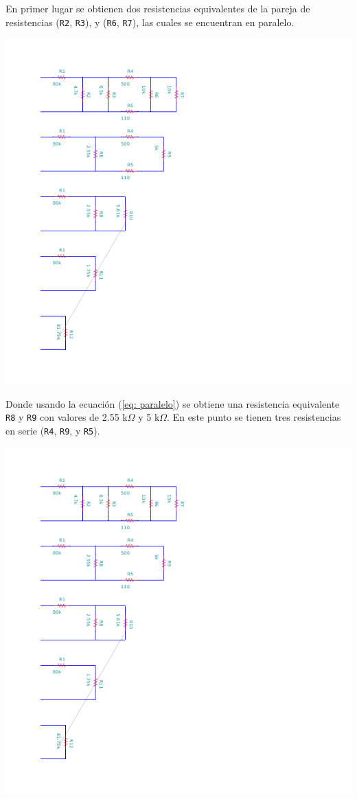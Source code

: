 \documentclass[12pt]{article}
\begin{document}
En primer lugar se obtienen dos resistencias equivalentes de la pareja de resistencias (\verb|R2|, \verb|R3|), y (\verb|R6|, \verb|R7|), las cuales se encuentran en paralelo.
\begin{center}
	\includegraphics[scale=2]{Circuito2.pdf}
\end{center}

Donde usando la ecuaci\'on (\ref{eq: paralelo}) se obtiene una resistencia equivalente \verb|R8| y \verb|R9| con valores de 2.55 k$\Omega$ y 5 k$\Omega$. En este punto se tienen tres resistencias en serie (\verb|R4|, \verb|R9|, y \verb|R5|).
\begin{center}
	\includegraphics[scale=2]{Circuito3.pdf}
\end{center}
\end{document}
